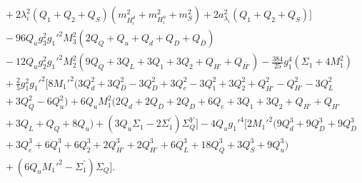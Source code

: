 \documentclass[preprint,amsmath,amssymb,aps,superscriptaddress,prd,showpacs,floatfix,nofootinbib]{revtex4-1}
\begin{document}
\begin{subequations}
\begin{align}
&{}+2\lambda_i^2\left ( Q_1+Q_2+Q_S\right )\left ( m_{H_i^d}^2+m_{H_i^u}^2+m_S^2\right )+2a_{\lambda_i}^2\left ( Q_1+Q_2+Q_S\right )\bigg ]\nonumber\\
&{}-96Q_ug_3^2g_1'^2M_3^2\left ( 2Q_Q+Q_u+Q_d+Q_D+Q_{\overline{D}}\right )\nonumber\\
&{}-12Q_ug_2^2g_1'^2M_2^2\left ( 9Q_Q+3Q_L+3Q_1+3Q_2+Q_{H'}+Q_{\overline{H'}}\right )-\frac{384}{25}g_1^4\left ( \Sigma_1+4M_1^2\right )\nonumber\\
&{}+\frac{2}{5}g_1^2g_1'^2\big [ 8M_1'^2 ( 3Q_d^2+3Q_{\overline{D}}^2-3Q_D^2+3Q_e^2-3Q_1^2+3Q_2^2+Q_{\overline{H'}}^2-Q_{H'}^2-3Q_L^2\nonumber\\
&{}+3Q_Q^2-6Q_u^2 )+6Q_uM_1^2 ( 2Q_d+2Q_{\overline{D}}+2Q_D+6Q_e+3Q_1+3Q_2+Q_{\overline{H'}}+Q_{H'}\nonumber\\
&{}+3Q_L+Q_Q+8Q_u )+\left ( 3Q_u\Sigma_1-2\Sigma_1^\prime\right ) \Sigma_Q^Y\big ]-4Q_ug_1'^4\big [ 2M_1'^2 ( 9Q_d^3+9Q_D^3+9Q_{\overline{D}}^3\nonumber\\
&{}+3Q_e^3+6Q_1^3+6Q_2^3+2Q_{\overline{H'}}^3+2Q_{H'}^3+6Q_L^3+18Q_Q^3+3Q_S^3+9Q_u^3 )\nonumber\\
&{}+\left(6Q_uM_1'^2-\Sigma_1^\prime\right )\Sigma_Q\big ].\label{eq:USSMmu222Ot2Coeff}
\end{align}
\end{subequations}

{}
\end{document}
